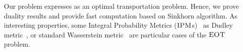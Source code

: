 Our problem expresses as an optimal transportation problem. Hence, we prove duality results and provide fast computation based on Sinkhorn algorithm. As interesting properties, some Integral Probability Metrics ($\textsc{IPM}$s)~\citep{muller1997integral} as Dudley metric~\citep{dudley1966weak}, or standard Wasserstein metric~\citep{villani2003topics} are particular cases of the $\textsc{EOT}$ problem.



